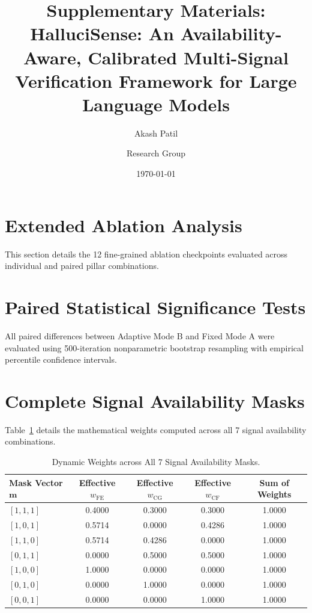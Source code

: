\documentclass[11pt,a4paper]{article}
\title{\textbf{Supplementary Materials:\\HalluciSense: An Availability-Aware, Calibrated Multi-Signal Verification Framework for Large Language Models}}
\author{Akash Patil \and Research Group}
\date{\today}
\begin{document}
\maketitle

\section{Extended Ablation Analysis}
This section details the 12 fine-grained ablation checkpoints evaluated across individual and paired pillar combinations.

\section{Paired Statistical Significance Tests}
All paired differences between Adaptive Mode B and Fixed Mode A were evaluated using 500-iteration nonparametric bootstrap resampling with empirical percentile confidence intervals.

\section{Complete Signal Availability Masks}
Table~\ref{tab:all_masks} details the mathematical weights computed across all 7 signal availability combinations.

\begin{table}[h]
\centering
\small
\caption{Dynamic Weights across All 7 Signal Availability Masks.}
\label{tab:all_masks}
\begin{tabular}{lcccc}
\toprule
\textbf{Mask Vector $\mathbf{m}$} & \textbf{Effective $w_{\text{FE}}$} & \textbf{Effective $w_{\text{CG}}$} & \textbf{Effective $w_{\text{CF}}$} & \textbf{Sum of Weights} \\
\midrule
$[1, 1, 1]$ & 0.4000 & 0.3000 & 0.3000 & 1.0000 \\
$[1, 0, 1]$ & 0.5714 & 0.0000 & 0.4286 & 1.0000 \\
$[1, 1, 0]$ & 0.5714 & 0.4286 & 0.0000 & 1.0000 \\
$[0, 1, 1]$ & 0.0000 & 0.5000 & 0.5000 & 1.0000 \\
$[1, 0, 0]$ & 1.0000 & 0.0000 & 0.0000 & 1.0000 \\
$[0, 1, 0]$ & 0.0000 & 1.0000 & 0.0000 & 1.0000 \\
$[0, 0, 1]$ & 0.0000 & 0.0000 & 1.0000 & 1.0000 \\
\bottomrule
\end{tabular}
\end{table}
\end{document}
